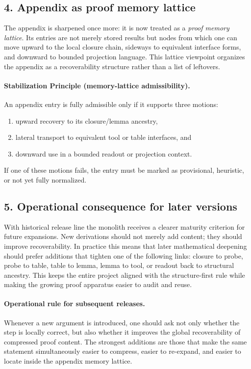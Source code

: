 \documentclass[12pt,a4paper]{article}
\DeclareRobustCommand{\QSCver}[1]{archival stage}
\renewcommand{\QSCver}[1]{historical release line}
\begin{document}
\subsection*{4. Appendix as proof memory lattice}
The appendix is sharpened once more: it is now treated as a \emph{proof memory
lattice}. Its entries are not merely stored results but nodes from which one can
move upward to the local closure chain, sideways to equivalent interface forms,
and downward to bounded projection language. This lattice viewpoint organizes the
appendix as a recoverability structure rather than a list of leftovers.

\paragraph{Stabilization Principle (memory-lattice admissibility).}
An appendix entry is fully admissible only if it supports three motions:
\begin{enumerate}[leftmargin=2em,label=(\alph*)]
 \item upward recovery to its closure/lemma ancestry,
 \item lateral transport to equivalent tool or table interfaces, and
 \item downward use in a bounded readout or projection context.
\end{enumerate}
If one of these motions fails, the entry must be marked as provisional,
heuristic, or not yet fully normalized.

\subsection*{5. Operational consequence for later versions}
With \QSCver{v1.9.0} the monolith receives a clearer maturity criterion for future
expansions. New derivations should not merely add content; they should improve
recoverability. In practice this means that later mathematical deepening should
prefer additions that tighten one of the following links: closure to probe,
probe to table, table to lemma, lemma to tool, or readout back to structural
ancestry. This keeps the entire project aligned with the structure-first rule
while making the growing proof apparatus easier to audit and reuse.

\paragraph{Operational rule for subsequent releases.}
Whenever a new argument is introduced, one should ask not only whether the step
is locally correct, but also whether it improves the global recoverability of
compressed proof content. The strongest additions are those that make the same
statement simultaneously easier to compress, easier to re-expand, and easier to
locate inside the appendix memory lattice.
\end{document}
